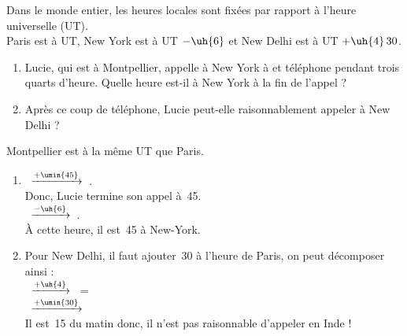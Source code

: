 \begin{exercice*}
   Dans le monde entier, les heures locales sont fixées par rapport à l'heure universelle (UT). \\
   Paris est à UT, New York est à UT $-\uh{6}$ et New Delhi est à UT $+\uh{4}\,30$.
   \begin{enumerate}
      \item Lucie, qui est à Montpellier, appelle à New York à  et téléphone pendant trois quarts d'heure. Quelle heure est-il à New York à la fin de l'appel ?
      \item Après ce coup de téléphone, Lucie peut-elle raisonnablement appeler à New Delhi ?
   \end{enumerate}
\end{exercice*}

\begin{corrige}
   Montpellier est à la même UT que Paris. \\
   \begin{enumerate}
      \item {}\, \quad $\xrightarrow{+\umin{45}}$ \quad {}\,. \\
         Donc, Lucie termine son appel à \,45. \\ [1mm]
         \, \quad $\xrightarrow{-\uh{6}}$ \quad {}\,. \\
         À cette heure, il est {\blue {}\,45} à New-York.
      \item Pour New Delhi, il faut ajouter \,30 à l'heure de Paris, on peut décomposer ainsi : \\ [1mm]
         \, \quad $\xrightarrow{+\uh{4}}$ \quad {}\, = \,\\ [1mm]
         \, \quad $\xrightarrow{+\umin{30}}$ \quad {}\, \\ [1mm]
         Il est \,15 du matin donc, {\blue il n'est pas raisonnable d'appeler en Inde !}
   \end{enumerate}
\end{corrige}

